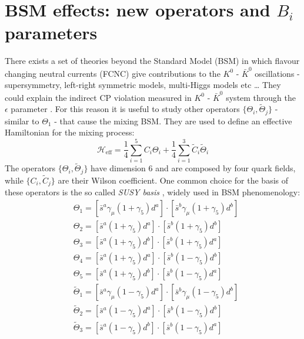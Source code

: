 \documentclass[english, LaM, oneside, noexaminfo]{sapthesis}
\newcommand{\kkb}{$K^0$ - $\bar K^0$ }
\begin{document}
\section{BSM effects: new operators and $B_i$ parameters}
\noindent
There exists a set of theories beyond the Standard Model (BSM) in which flavour changing neutral currents (FCNC) give contributions to the \kkb oscillations - supersymmetry, left-right symmetric models, multi-Higgs models etc \dots
They could explain the indirect CP violation measured in \kkb system through the $\epsilon$ parameter \cite{Donoghue}.
For this reason it is useful to study other operators $\{\Theta_i,\tilde\Theta_j\}$ - similar to $\Theta_1$ - that cause the mixing BSM.
They are used to define an effective Hamiltonian for the mixing process:
\begin{equation*}
    \mathcal{H}_\text{eff} = \frac{1}{4} \sum_{i = 1}^5 C_i \Theta_i + \frac{1}{4} \sum_{i = 1}^3 \tilde C_i \tilde \Theta_i
\end{equation*}
The operators $\{\Theta_i,\tilde\Theta_j\}$ have dimension 6 and are composed by four quark fields, while $\{C_i,\tilde C_j\}$ are their Wilson coefficient.
One common choice for the basis of these operators is the so called \textit{SUSY basis} \cite{Bparameters}, widely used in BSM phenomenology:
\begin{equation}\label{eq:Thetai-operators}
    \begin{aligned}
       & \Theta_1 = [\bar s^a \gamma_\mu (1+\gamma_5) d^a] \cdot [ \bar s^b \gamma_\mu (1+\gamma_5) d^b ] \\
       & \Theta_2 = [\bar s^a  (1+\gamma_5) d^a ] \cdot [ \bar s^b (1+\gamma_5) d^b ] \\
       & \Theta_3 = [\bar s^a  (1+\gamma_5) d^b ] \cdot [ \bar s^b (1+\gamma_5) d^a ] \\
       & \Theta_4 = [\bar s^a  (1+\gamma_5) d^a ] \cdot [ \bar s^b (1-\gamma_5) d^b ] \\
       & \Theta_5 = [\bar s^a  (1+\gamma_5) d^b ] \cdot [ \bar s^b (1-\gamma_5) d^a ] \\
       & \tilde\Theta_1 = [\bar s^a \gamma_\mu (1-\gamma_5) d^a] \cdot [ \bar s^b \gamma_\mu (1-\gamma_5) d^b ] \\
       & \tilde\Theta_2 = [\bar s^a  (1-\gamma_5) d^a] \cdot [ \bar s^b (1-\gamma_5) d^b ] \\
       & \tilde\Theta_3 = [\bar s^a  (1-\gamma_5) d^b] \cdot [ \bar s^b (1-\gamma_5) d^a ]
    \end{aligned}
\end{equation}
\end{document}
